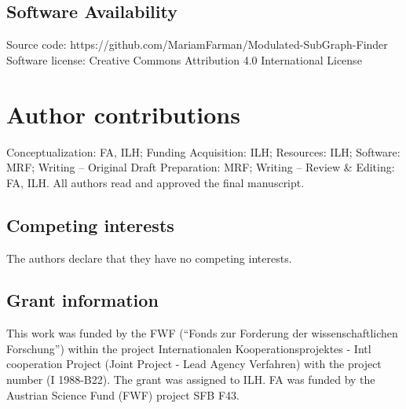 \documentclass[10pt,a4paper,twocolumn]{article}
\begin{document}
\subsection*{Software Availability}


Source code: https://github.com/MariamFarman/Modulated-SubGraph-Finder \newline
Software license: Creative Commons Attribution 4.0 International License
\section*{Author contributions}
Conceptualization: FA, ILH; Funding Acquisition: ILH; Resources: ILH;
Software: MRF; Writing – Original Draft Preparation: MRF; Writing –
Review \& Editing: FA, ILH. All authors read and approved the final
manuscript.

\subsection*{Competing interests}

The authors declare that they have no competing interests.


\subsection*{Grant information}

This work was funded by the FWF (“Fonds zur Forderung der
wissenschaftlichen Forschung”) within the project Internationalen
Kooperationsprojektes - Intl cooperation Project (Joint Project - Lead
Agency Verfahren) with the project number (I 1988-B22). The grant was
assigned to ILH. FA was funded by the Austrian Science Fund (FWF)
project SFB F43.


{\small
}

\bigskip



\begin{figure}
	\centering
	
\end{figure}
\end{document}
